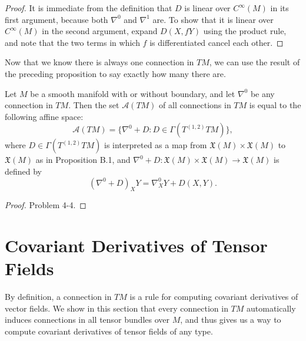 \begin{proof}
It is immediate from the definition that $D$ is linear over $C^\infty(M)$ in its first argument, because both $\nabla^0$ and $\nabla^1$ are. To show that it is linear over $C^\infty(M)$ in the second argument, expand $D(X, fY)$ using the product rule, and note that the two terms in which $f$ is differentiated cancel each other.
\end{proof}

Now that we know there is always one connection in $TM$, we can use the result of the preceding proposition to say exactly how many there are.

\begin{theorem}
\label{thm:connections-affine-space}
Let $M$ be a smooth manifold with or without boundary, and let $\nabla^0$ be any connection in $TM$. Then the set $\mathcal{A}(TM)$ of all connections in $TM$ is equal to the following affine space:
\[
\mathcal{A}(TM) = \{\nabla^0 + D : D \in \Gamma(T^{(1,2)}TM)\},
\]
where $D \in \Gamma(T^{(1,2)}TM)$ is interpreted as a map from $\mathfrak{X}(M) \times \mathfrak{X}(M)$ to $\mathfrak{X}(M)$ as in Proposition B.1, and $\nabla^0 + D : \mathfrak{X}(M) \times \mathfrak{X}(M) \to \mathfrak{X}(M)$ is defined by
\[
(\nabla^0 + D)_X Y = \nabla^0_X Y + D(X,Y).
\]
\end{theorem}

\begin{proof}
Problem 4-4.
\end{proof}

\section{Covariant Derivatives of Tensor Fields}

By definition, a connection in $TM$ is a rule for computing covariant derivatives of vector fields. We show in this section that every connection in $TM$ automatically induces connections in all tensor bundles over $M$, and thus gives us a way to compute covariant derivatives of tensor fields of any type.

